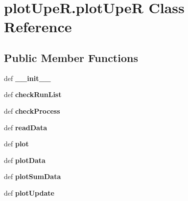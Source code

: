 \hypertarget{classplotUpeR_1_1plotUpeR}{\section{plot\-Upe\-R.\-plot\-Upe\-R Class Reference}
\label{classplotUpeR_1_1plotUpeR}
}
\subsection*{Public Member Functions}
\begin{DoxyCompactItemize}
\item 
\hypertarget{classplotUpeR_1_1plotUpeR_a0637c8773d120e3dac906d04ff1ea5b5}{def {\bfseries \-\_\-\-\_\-init\-\_\-\-\_\-}}\label{classplotUpeR_1_1plotUpeR_a0637c8773d120e3dac906d04ff1ea5b5}

\item 
\hypertarget{classplotUpeR_1_1plotUpeR_abc5cf97ef23d691b188b32bca04f6c78}{def {\bfseries check\-Run\-List}}\label{classplotUpeR_1_1plotUpeR_abc5cf97ef23d691b188b32bca04f6c78}

\item 
\hypertarget{classplotUpeR_1_1plotUpeR_aaf01f3328f611614e84ed8ba67f28011}{def {\bfseries check\-Process}}\label{classplotUpeR_1_1plotUpeR_aaf01f3328f611614e84ed8ba67f28011}

\item 
\hypertarget{classplotUpeR_1_1plotUpeR_a1ffcebf796e731004eaee85d4f46e685}{def {\bfseries read\-Data}}\label{classplotUpeR_1_1plotUpeR_a1ffcebf796e731004eaee85d4f46e685}

\item 
\hypertarget{classplotUpeR_1_1plotUpeR_aa55cdd30b94c4a6fea2423c5e8194c93}{def {\bfseries plot}}\label{classplotUpeR_1_1plotUpeR_aa55cdd30b94c4a6fea2423c5e8194c93}

\item 
\hypertarget{classplotUpeR_1_1plotUpeR_ae784a555d5cb2b9ccb4e05c6ff755035}{def {\bfseries plot\-Data}}\label{classplotUpeR_1_1plotUpeR_ae784a555d5cb2b9ccb4e05c6ff755035}

\item 
\hypertarget{classplotUpeR_1_1plotUpeR_a1bb2f5431de9e1cf961310c03312371b}{def {\bfseries plot\-Sum\-Data}}\label{classplotUpeR_1_1plotUpeR_a1bb2f5431de9e1cf961310c03312371b}

\item 
\hypertarget{classplotUpeR_1_1plotUpeR_acf0815c77a6b7b7349813a52dc372c1d}{def {\bfseries plot\-Update}}\label{classplotUpeR_1_1plotUpeR_acf0815c77a6b7b7349813a52dc372c1d}


\end{DoxyCompactItemize}
